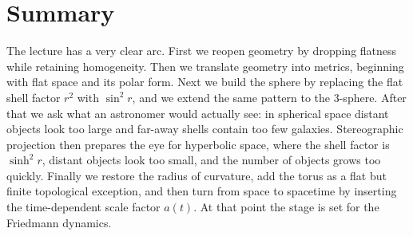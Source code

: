 \section{Summary}

The lecture has a very clear arc. First we reopen geometry by dropping flatness while retaining homogeneity. Then we translate geometry into metrics, beginning with flat space and its polar form. Next we build the sphere by replacing the flat shell factor \(r^2\) with \(\sin^2 r\), and we extend the same pattern to the \(3\)-sphere. After that we ask what an astronomer would actually see: in spherical space distant objects look too large and far-away shells contain too few galaxies. Stereographic projection then prepares the eye for hyperbolic space, where the shell factor is \(\sinh^2 r\), distant objects look too small, and the number of objects grows too quickly. Finally we restore the radius of curvature, add the torus as a flat but finite topological exception, and then turn from space to spacetime by inserting the time-dependent scale factor \(a(t)\). At that point the stage is set for the Friedmann dynamics.